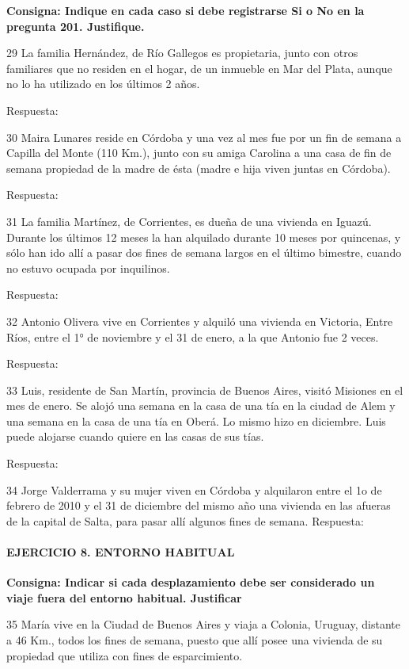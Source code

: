 \documentclass[
  openany]{book}
\begin{document}
\textbf{Consigna: Indique en cada caso si debe registrarse Si o No en la pregunta 201. Justifique.}

29 La familia Hernández, de Río Gallegos es propietaria, junto con otros familiares que no residen en el hogar, de un inmueble en Mar del Plata, aunque no lo ha utilizado en los últimos 2 años.

Respuesta:

30 Maira Lunares reside en Córdoba y una vez al mes fue por un fin de semana a Capilla del Monte (110 Km.), junto con su amiga Carolina a una casa de fin de semana propiedad de la madre de ésta (madre e hija viven juntas en Córdoba).

Respuesta:

31 La familia Martínez, de Corrientes, es dueña de una vivienda en Iguazú. Durante los últimos 12 meses la han alquilado durante 10 meses por quincenas, y sólo han ido allí a pasar dos fines de semana largos en el último bimestre, cuando no estuvo ocupada por inquilinos.

Respuesta:

32 Antonio Olivera vive en Corrientes y alquiló una vivienda en Victoria, Entre Ríos, entre el 1° de noviembre y el 31 de enero, a la que Antonio fue 2 veces.

Respuesta:

33 Luis, residente de San Martín, provincia de Buenos Aires, visitó Misiones en el mes de enero. Se alojó una semana en la casa de una tía en la ciudad de Alem y una semana en la casa de una tía en Oberá. Lo mismo hizo en diciembre. Luis puede alojarse cuando quiere en las casas de sus tías.

Respuesta:

34 Jorge Valderrama y su mujer viven en Córdoba y alquilaron entre el 1o de febrero de 2010 y el 31 de diciembre del mismo año una vivienda en las afueras de la capital de Salta, para pasar allí algunos fines de semana. Respuesta:

\hypertarget{ejercicio-8.-entorno-habitual}{%
\paragraph{\texorpdfstring{\textbf{EJERCICIO 8. ENTORNO HABITUAL}}{EJERCICIO 8. ENTORNO HABITUAL}}\label{ejercicio-8.-entorno-habitual}}

\textbf{Consigna: Indicar si cada desplazamiento debe ser considerado un viaje fuera del entorno habitual. Justificar}

35 María vive en la Ciudad de Buenos Aires y viaja a Colonia, Uruguay, distante a 46 Km., todos los fines de semana, puesto que allí posee una vivienda de su propiedad que utiliza con fines de esparcimiento.
\end{document}
